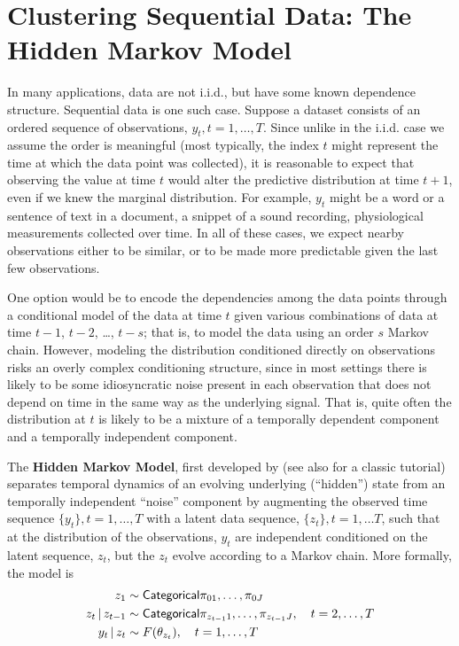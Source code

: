 \section{Clustering Sequential Data: The Hidden Markov Model}

In many applications, data are not i.i.d., but have some known
dependence structure.  Sequential data is one such case.  Suppose a
dataset consists of an ordered sequence of observations, ${y_t}, t =
1, \dots, T$.  Since unlike in the i.i.d. case we assume the order is
meaningful (most typically, the index $t$ might represent the time at which the data
point was collected), it is reasonable to expect that observing the
value at time $t$ would alter the predictive distribution at time
$t+1$, even if we knew the marginal distribution.  For example, $y_t$
might be a word or a sentence of text in a document, a snippet of a
sound recording, physiological measurements collected over time.  In
all of these cases, we expect nearby observations either to be
similar, or to be made more predictable given the last few observations.

One option would be to encode the dependencies among the data points
through a conditional model of the data at time $t$ given various
combinations of data at time $t-1$, $t-2$, \dots, $t-s$; that is, to
model the data using an order $s$ Markov chain. However, modeling the
distribution conditioned directly on observations risks an overly
complex conditioning structure, since in most settings there is likely
to be some idiosyncratic noise present in each observation that does
not depend on time in the same way as the underlying signal.  That is,
quite often the distribution at $t$ is likely to be a mixture of a temporally dependent
component and a temporally independent component.

The {\bf Hidden Markov Model}, first developed by
\citet{baum1966statistical} (see also \citet{rabiner1986introduction}
for a classic tutorial) separates temporal dynamics of an evolving
underlying (``hidden'') state from an temporally independent ``noise''
component by augmenting the observed time sequence $\{y_t\}, t = 1,
\dots, T$ with a latent data sequence, $\{z_t\}, t = 1,
\dots T$, such that at the distribution of the observations, $y_t$ are
independent conditioned on the latent sequence, $z_t$, but the $z_t$
evolve according to a Markov chain.  More formally, the model is
\begin{align}
  z_1 &\sim \mathsf{Categorical}{\pi_{01}, \dots, \pi_{0J}} \\
  z_t \, \vert \, z_{t-1} &\sim \mathsf{Categorical}{\pi_{z_{t-1}1}, \dots,
    \pi_{z_{t-1}J}}, \quad t = 2, \dots, T
  \\
  y_t \, \vert \, z_t &\sim F(\theta_{z_t}), \quad t = 1, \dots, T
\end{align}

